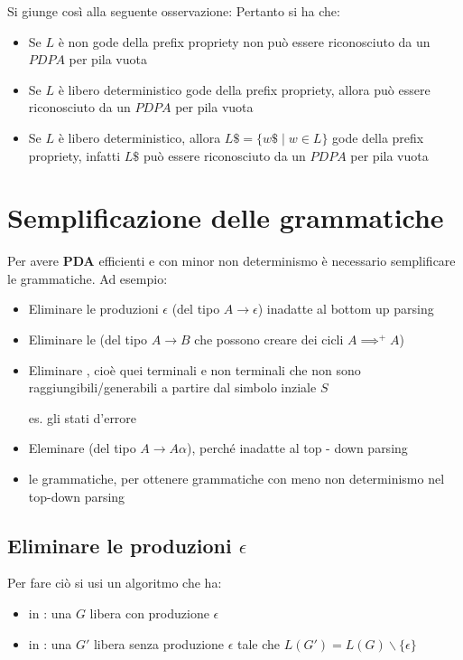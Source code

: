 Si giunge così alla seguente osservazione:
Pertanto si ha che:
\begin{itemize}
    \item Se $L$ è non gode della prefix propriety non può essere riconosciuto da un $PDPA$ per pila vuota
    \item Se $L$ è libero deterministico gode della prefix propriety, allora può essere riconosciuto da un $PDPA$ per pila vuota
    \item Se $L$ è libero deterministico, allora $L\$ =\{w\$ \mid w\in L\}$ gode della prefix propriety, infatti $L\$$ può essere riconosciuto da un $PDPA$ per pila vuota
\end{itemize}

\section{Semplificazione delle grammatiche}
Per avere \textbf{PDA} efficienti e con minor non determinismo è necessario semplificare le grammatiche. Ad esempio:
\begin{itemize}
    \item Eliminare le produzioni $\epsilon$ (del tipo $A\to\epsilon$) inadatte al bottom up parsing
    \item Eliminare le  (del tipo $A\to B$ che possono creare dei cicli $A \implies^+ A$) 
    \item Eliminare , cioè quei terminali e non terminali che non sono raggiungibili/generabili a partire dal simbolo inziale $S$
    
    es. gli stati d'errore 

    \item  Eleminare  (del tipo $A \to A\alpha$), perché inadatte al top - down parsing
    \item {} le grammatiche, per ottenere grammatiche con meno non determinismo nel top-down parsing
\end{itemize}

\subsection{Eliminare le produzioni $\epsilon$}
Per fare ciò si usi un algoritmo che ha:
\begin{itemize}
    \item in : una $G$ libera con produzione $\epsilon$ 
    \item in : una $G'$ libera senza produzione $\epsilon$ tale che $L(G') = L(G)\backslash\{\epsilon\}$ 
\end{itemize}

